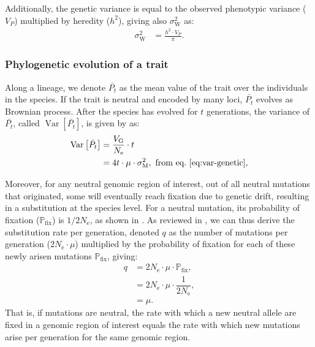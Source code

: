 \documentclass{article}
\newcommand{\Multiply}{\cdot}
\DeclareMathOperator{\Var}{\text{Var}}
\newcommand{\Ne}{N_{\text{e}}}
\newcommand{\proba}{\mathbb{P}}
\newcommand{\pfix}{\proba_{\text{fix}}}
\newcommand{\Time}{t}
\newcommand{\Trait}{P}
\newcommand{\Heredity}{h^2}
\newcommand{\MeanTrait}{\bar{\Trait_{\Time}}}
\newcommand{\VarPhy}{\Var \left[\MeanTrait\right]}
\newcommand{\MutationRate}{\mu}
\newcommand{\SubRate}{q}
\newcommand{\VarPhenotype}{V_{\Trait}}
\newcommand{\VarGenetic}{V_{\mathrm{G}}}
\newcommand{\RateMut}{\sigma^2_{\mathrm{M}}}
\newcommand{\RatePop}{\sigma^2_{\mathrm{W}}}
\begin{document}
Additionally, the genetic variance is equal to the observed phenotypic variance ($\VarPhenotype$) multiplied by heredity ($\Heredity$), giving also $\RatePop$ as:
\begin{align}
    \RatePop & = \frac{\Heredity \Multiply \VarPhenotype }{\pi }. \label{eq:rate-pheno-pop}
\end{align}

\subsubsection{Phylogenetic evolution of a trait}

Along a lineage, we denote $\MeanTrait$ as the mean value of the trait over the individuals in the species.
If the trait is neutral and encoded by many loci, $\MeanTrait$ evolves as Brownian process\cite{hansen_translating_1996}.
After the species has evolved for $\Time$ generations, the variance of $\MeanTrait$, called $\VarPhy$, is given by \textcite{hansen_translating_1996} as:
\begin{align}
    \VarPhy & = \frac{\VarGenetic}{\Ne} \Multiply \Time \\
    & = 4 \Time \Multiply \MutationRate \Multiply \RateMut \label{eq:covar},\text{ from eq.~\ref{eq:var-genetic}},
\end{align}

Moreover, for any neutral genomic region of interest, out of all neutral mutations that originated, some will eventually reach fixation due to genetic drift, resulting in a substitution at the species level.
For a neutral mutation, its probability of fixation ($\pfix$) is $1/2\Ne$, as shown in \textcite{kimura_probability_1962}.
As reviewed in \textcite{mccandlish_modeling_2014}, we can thus derive the substitution rate per generation, denoted $\SubRate$ as the number of mutations per generation ($2\Ne \Multiply \MutationRate$) multiplied by the probability of fixation for each of these newly arisen mutations $\pfix$, giving:
\begin{align}
    \SubRate & = 2 \Ne \Multiply \MutationRate \Multiply \pfix, \\
    & = 2 \Ne  \Multiply \MutationRate  \Multiply \dfrac{1}{2\Ne}, \\
    & = \MutationRate. \label{eq:substitution-rate}
\end{align}
That is, if mutations are neutral, the rate with which a new neutral allele are fixed in a genomic region of interest equals the rate with which new mutations arise per generation for the same genomic region\cite{kimura_evolutionary_1968}.
\end{document}
